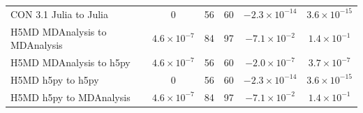 \begin{table}[ht]
{\begin{tabular}{@{}lccccc@{}}
CON 3.1 Julia to Julia & 0 & 56 & 60 & \(-2.3\times10^{-14}\) & \(3.6\times10^{-15}\) \\
H5MD MDAnalysis to MDAnalysis & \(4.6\times10^{-7}\) & 84 & 97 & \(-7.1\times10^{-2}\) & \(1.4\times10^{-1}\) \\
H5MD MDAnalysis to h5py & \(4.6\times10^{-7}\) & 56 & 60 & \(-2.0\times10^{-7}\) & \(3.7\times10^{-7}\) \\
H5MD h5py to h5py & 0 & 56 & 60 & \(-2.3\times10^{-14}\) & \(3.6\times10^{-15}\) \\
H5MD h5py to MDAnalysis & \(4.6\times10^{-7}\) & 84 & 97 & \(-7.1\times10^{-2}\) & \(1.4\times10^{-1}\) \\
\bottomrule
\end{tabular}}
\end{table}
